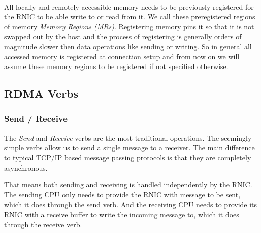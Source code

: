 \paragraph{}  All locally and remotely accessible memory needs to be previously registered for the RNIC to be able write to
or read from it. We call these preregistered regions of memory \emph{Memory Regions (MRs)}.  
Registering memory pins it so that it is not swapped out by the host and the process of registering is generally orders of magnitude slower 
then data operations like sending or writing. So in general all accessed memory is registered at connection setup and from 
now on we will assume these memory regions to be registered if not specified otherwise.



\subsection{RDMA Verbs}\label{sec:bg:verbs}

\subsubsection{Send / Receive} \label{sec:bg:send}
The \emph{Send} and \emph{Receive} verbs are the most traditional operations. The seemingly simple verbs allow 
us to send a single message to  a receiver. The main difference to typical TCP/IP based message passing protocols is that
they are completely asynchronous.

That means both sending and receiving is handled independently by the RNIC. The sending CPU only needs to provide
the RNIC with message to be sent, which it does through the send verb. And the receiving CPU needs to provide its RNIC with 
a receive buffer to write the incoming message to, which it does through the receive verb.





